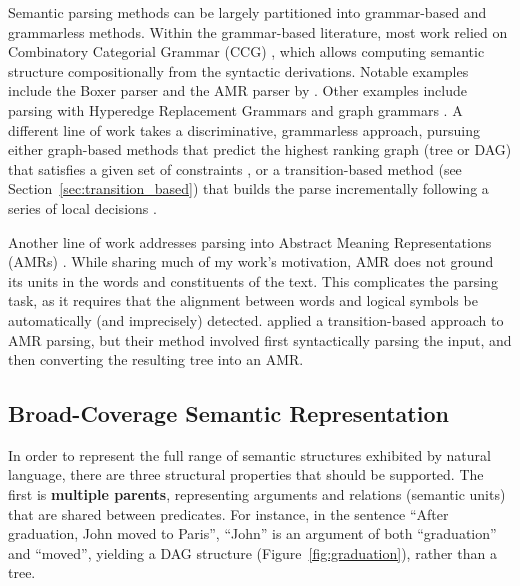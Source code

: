\documentclass[11pt]{article}
\newcommand{\secref}[1]{Section~\ref{#1}}
\newcommand{\figref}[1]{Figure~\ref{#1}}
\begin{document}
Semantic parsing methods can be largely partitioned into grammar-based and grammarless methods.
Within the grammar-based literature, most work relied on Combinatory Categorial Grammar (CCG)
\cite{Steedman:00}, which allows computing semantic structure compositionally from the
syntactic derivations. Notable examples include the Boxer parser \cite{bos2005towards}
and the AMR parser by \cite{artzi2015broad}.
Other examples include parsing with Hyperedge Replacement Grammars
\cite{jones2012semantics,chiang2013parsing,peng2015synchronous} and
graph grammars \cite{koller2015semantic}.
A different line of work takes a discriminative, grammarless approach,
pursuing either graph-based methods that predict the highest ranking graph
(tree or DAG) that satisfies a given set of constraints
\cite[for AMR parsing]{flanigan2014discriminative},
or a transition-based method (see \secref{sec:transition_based})
that builds the parse incrementally following a series of local
decisions \cite[and much subsequent work]{Nivre03anefficient}.

Another line of work addresses parsing into Abstract Meaning Representations (AMRs)
\cite{flanigan2014discriminative,vanderwende2015amr,pust2015parsing,artzi2015broad}. 
While sharing much of my work's motivation,
AMR does not ground its units in the words and constituents of the text.
This complicates the parsing task, as it requires
that the alignment between words and logical symbols be automatically
(and imprecisely) detected.
\cite{wang2015transition} applied a transition-based approach to AMR parsing,
but their method involved first syntactically parsing the input, and then converting
the resulting tree into an AMR.

\subsection{Broad-Coverage Semantic Representation}\label{sec:broad_coverage}

In order to represent the full range of semantic structures exhibited by
natural language, there are three structural properties that should be supported.
The first is \textbf{multiple parents},
representing arguments and relations (semantic units) that are shared between predicates.
For instance, in the sentence
``After graduation, John moved to Paris'', ``John'' is an argument of both ``graduation''
and ``moved'', yielding a DAG structure (\figref{fig:graduation}), rather than a tree.
\end{document}
